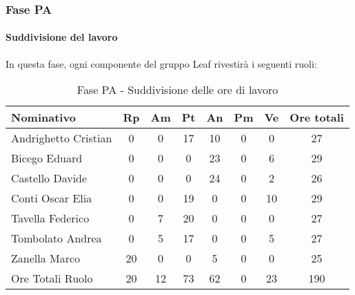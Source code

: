 \documentclass[../PianoProgetto.tex]{subfiles}
\begin{document}
	\subsubsection{Fase PA}
				\paragraph{Suddivisione del lavoro}
					In questa fase, ogni componente del gruppo Leaf rivestirà i seguenti ruoli:
	
					\begin{table}[h]
		\centering
	
		\begin{tabular}{l * {7}{c}}
			\toprule
			Nominativo & Rp & Am & Pt & An & Pm & Ve & Ore totali \\
			\midrule
			Andrighetto Cristian & 0 & 0 &	17 & 10 & 0 & 0 & 27 \\
			\midrule
			Bicego Eduard & 0 & 0 & 0 & 23 & 0 & 6 & 29 \\
			\midrule
			Castello Davide & 0 & 0 & 0 & 24 & 0 & 2 & 26 \\
			\midrule
			Conti Oscar Elia & 0 & 0 &	19 & 0 & 0 & 10 & 29 \\
			\midrule
			Tavella Federico &	0 & 7 & 20 & 0 & 0 & 0 & 27 \\
			\midrule
			Tombolato Andrea & 0 & 5 &	17 & 0 & 0 & 5 & 27 \\
			\midrule
			Zanella Marco & 20 & 0 & 0 & 5 & 0 & 0 & 25 \\
			\midrule			
			Ore Totali Ruolo & 20 & 12 & 73 & 62 & 0 & 23 & 190 \\
			\bottomrule
			
		\end{tabular}
		
		\caption{Fase PA - Suddivisione delle ore di lavoro}
		\label{tab:fasePA_ore}
		
	\end{table}
	
\end{document}
